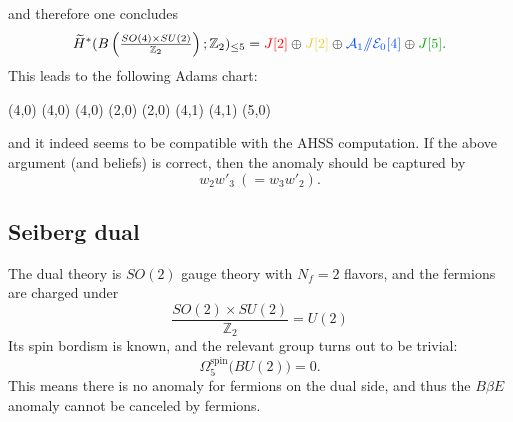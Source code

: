 \documentclass[12pt]{article}
\numberwithin{equation}{section}
\newcommand*{\colorA}[1]{\textcolor{colorA}{#1}}
\newcommand*{\colorB}[1]{\textcolor{colorB}{#1}}
\newcommand*{\colorC}[1]{\textcolor{colorC}{#1}}
\newcommand*{\colorD}[1]{\textcolor{colorD}{#1}}
\def\bZ{\mathbb{Z}}
\begin{document}
and therefore one concludes
\begin{equation}
	\widetilde H^\ast(B\left(\tfrac{SO(4)\times SU(2)}{\bZ_2}\right);\bZ_2)_{\leq 5} = \colorA{J[2]} \oplus \colorC{J[2]} \oplus \colorB{\mathcal{A}_1/\!\!/\mathcal{E}_0[4]} \oplus \colorD{J[5]}.
\end{equation}
This leads to the following Adams chart:
\begin{center}
	\begin{sseqdata}[
		name=M,
		Adams grading,
		classes = fill,
		xrange = {0}{5},
		yrange = {0}{3},
	]
		\tower[colorB](4,0)
		\class[white](4,0)
		\class[white](4,0)
		\class[colorA](2,0)
		\class[colorC](2,0)
		\tower[colorA](4,1)
		\tower[colorC](4,1)
		\class[colorD](5,0)
	\end{sseqdata}
	\printpage[name = M,page = 2]
\end{center}
and it indeed seems to be compatible with the AHSS computation.
If the above argument (and beliefs) is correct, then the anomaly should be captured by
\begin{equation}
	w_2w'_3\ (= w_3w'_2).
\end{equation}

\subsection{Seiberg dual}
The dual theory is $SO(2)$ gauge theory with $N_f = 2$ flavors, and the fermions are charged under
\begin{equation}
	\frac{SO(2)\times SU(2)}{\bZ_2}
	=
	U(2)
\end{equation}
Its spin bordism is known, and the relevant group turns out to be trivial:
\begin{equation}
	\Omega_5^{\mathrm{spin}}\big(BU(2)\big) = 0.
\end{equation}
This means there is no anomaly for fermions on the dual side,
and thus the $B\beta E$ anomaly cannot be canceled by fermions.

\newpage
\end{document}
